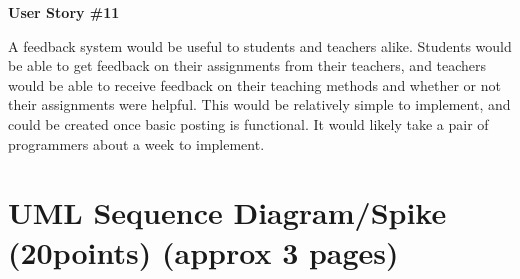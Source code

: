 \documentclass[12pt]{article}
\begin{document}
\textbf{User Story \#11}
\begin{flushleft}
A feedback system would be useful to students and teachers alike. Students would be able to get feedback on their assignments from their teachers, and teachers would be able to receive feedback on their teaching methods and whether or not their assignments were helpful. This would be relatively simple to implement, and could be created once basic posting is functional. It would likely take a pair of programmers about a week to implement.
\newline
\end{flushleft}


\section{UML Sequence Diagram/Spike (20points) (approx 3 pages)}
\end{document}
